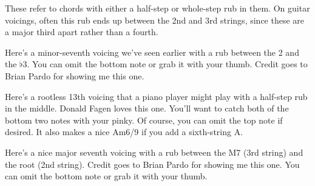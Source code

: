 
These refer to chords with either a half-step or whole-step rub in them.  On guitar voicings, often this rub ends up between the 2nd and 3rd strings, since these are a major third apart rather than a fourth.

\def\numfrets{6}

Here's a minor-seventh voicing we've seen earlier with a rub between the 2 and the $\flat$3.  You can omit the bottom note or grab it with your thumb.  Credit goes to Brian Pardo for showing me this one.


Here's a rootless 13th voicing that a piano player might play with a half-step rub in the middle.  Donald Fagen loves this one.  You'll want to catch both of the bottom two notes with your pinky.  Of course, you can omit the top note if desired.  It also makes a nice Am6/9 if you add a sixth-string A.


Here's a nice major seventh voicing with a rub between the M7 (3rd string) and the root (2nd string).  Credit goes to Brian Pardo for showing me this one.  You can omit the bottom note or grab it with your thumb.

